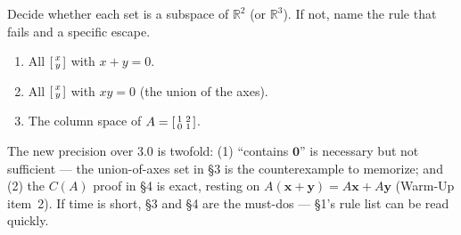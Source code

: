 \documentclass[10pt]{article}
\newcommand{\xx}{\mathbf{x}}
\newcommand{\yy}{\mathbf{y}}
\newcommand{\zero}{\mathbf{0}}
\begin{document}
\begin{practicebox}
Decide whether each set is a subspace of $\mathbb{R}^2$ (or $\mathbb{R}^3$). If not, name the rule
that fails and a specific escape.
\begin{enumerate}[leftmargin=1.6em, itemsep=4pt]
  \item All $\begin{bsmallmatrix} x\\y \end{bsmallmatrix}$ with $x+y=0$. 
  \item All $\begin{bsmallmatrix} x\\y \end{bsmallmatrix}$ with $xy=0$ (the union of the axes). 
  \item The column space of $A=\begin{bsmallmatrix} 1 & 2 \\ 0 & 1 \end{bsmallmatrix}$. 
\end{enumerate}
\end{practicebox}

\begin{teachernote}
The new precision over 3.0 is twofold: (1) ``contains $\zero$'' is necessary but not sufficient ---
the union-of-axes set in \S3 is the counterexample to memorize; and (2) the $C(A)$ proof in \S4 is
exact, resting on $A(\xx+\yy)=A\xx+A\yy$ (Warm-Up item~2). If time is short, \S3 and \S4 are the
must-dos --- \S1's rule list can be read quickly.
\end{teachernote}
\end{document}
